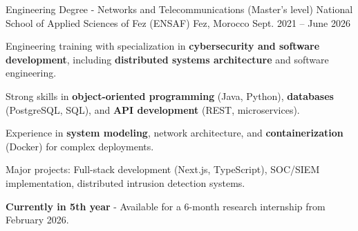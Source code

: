 
\begin{cventries}

    \cventry
    {Engineering Degree - Networks and Telecommunications (Master's level)} %
    {National School of Applied Sciences of Fez (ENSAF)} %
    {Fez, Morocco} %
    {Sept. 2021 – June 2026} %
    {
        \begin{cvitems} %
            \item {Engineering training with specialization in \textbf{cybersecurity and software development}, including \textbf{distributed systems architecture} and software engineering.}
            \item {Strong skills in \textbf{object-oriented programming} (Java, Python), \textbf{databases} (PostgreSQL, SQL), and \textbf{API development} (REST, microservices).}
            \item {Experience in \textbf{system modeling}, network architecture, and \textbf{containerization} (Docker) for complex deployments.}
            \item {Major projects: Full-stack development (Next.js, TypeScript), SOC/SIEM implementation, distributed intrusion detection systems.}
            \item {\textbf{Currently in 5th year} - Available for a 6-month research internship from February 2026.}
        \end{cvitems}
    }
\end{cventries}
